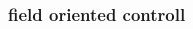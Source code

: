 \documentclass{beamer}
\begin{document}
\begin{frame}
  
  \frametitle{\bf field oriented controll}    

  
  \begin{columns}

    \begin{column}{0.5\textwidth}
    \end{column}


\end{columns}
\end{frame}
\end{document}
